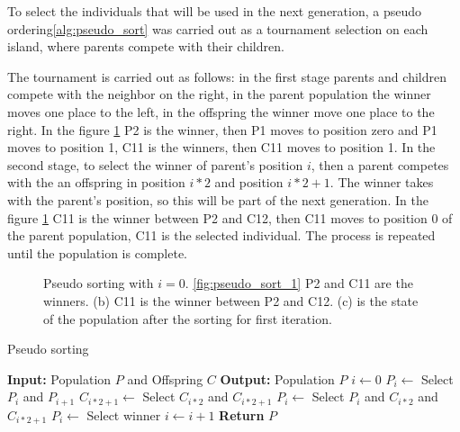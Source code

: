 \documentclass{IEEEtran}
\begin{document}
To select the individuals that will be used in the next generation, a pseudo ordering\ref{alg:pseudo_sort} was carried out as a tournament selection on each island, where parents compete with their children.

The tournament is carried out as follows: in the first stage parents and children compete with the neighbor on the right, in the parent population the winner moves one place to the left, in the offspring the winner move one place to the right. In the figure \ref{fig:pseudo_sort} P2 is the winner, then P1 moves to position zero and P1 moves to position 1, C11 is the winners, then C11 moves to position 1. In the second stage, to select the winner of parent's position $i$, then a parent competes  with the an offspring in position $i * 2$ and position $i * 2 + 1$. The winner takes with the parent's position, so this will be part of the next generation. In the figure \ref{fig:pseudo_sort} C11 is the winner between P2 and C12, then C11 moves to position 0 of the parent population, C11 is the selected individual. The process is repeated until the population is complete.

\begin{figure}[ht]
  \centering
  \subfloat[Stage 1]{
    
    \label{fig:pseudo_sort_1}
  }
  \subfloat[Stage 2]{
    
    \label{fig:pseudo_sort_2}
  }
  \subfloat[Stage 3]{
    
    \label{fig:pseudo_sort_3}
  }
  \caption{Pseudo sorting with $i=0$. \ref{fig:pseudo_sort_1} P2 and C11 are the winners. (b) C11 is the winner between P2 and C12. (c) is the state of the population after the sorting for first iteration.}
  \label{fig:pseudo_sort}
\end{figure}



\begin{algorithm}[H]
  \caption{Pseudo sorting}
  \label{alg:pseudo_sort}
  \begin{algorithmic}[1]
    \State \textbf{Input:} Population $P$ and Offspring $C$
    \State \textbf{Output:} Population $P$
    \State $i \gets 0$
    \State $P_i \gets$ Select $P_i$ and $P_{i+1}$
    \State $C_{i*2+1} \gets$ Select $C_{i*2}$ and $C_{i*2+1}$
    \State $P_i \gets$ Select $P_i$ and $C_{i*2}$ and $C_{i*2+1}$
    \State $P_i \gets$ Select winner
    \State $i \gets i + 1$
    \EndWhile
    \State \textbf{Return} $P$
  \end{algorithmic}
\end{algorithm}
\end{document}
